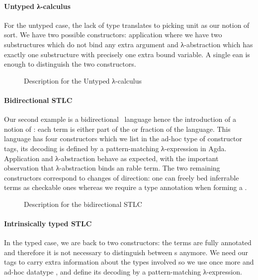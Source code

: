 \paragraph{Untyped λ-calculus} For the untyped case, the lack of
type translates to picking unit as our notion of sort. We have two possible
constructors: application where we have two substructures which do not bind
any extra argument and λ-abstraction which has exactly one substructure
with precisely one extra bound variable. A single ean is enough to
distinguish the two constructors.

\begin{figure}[h]
  \caption{Description for the Untyped λ-calculus}
\end{figure}

\paragraph{Bidirectional STLC}\label{par:bidirectional} Our second example is a
bidirectional~\cite{pierce2000local} language hence the introduction of a
notion of : each term is either part of the  or
 fraction of the language. This language has four constructors
which we list in the ad-hoc  type of constructor tags, its
decoding  is defined by a pattern-matching λ-expression in Agda.
Application and λ-abstraction behave as expected, with the important
observation that λ-abstraction binds an rable term. The two
remaining constructors correspond to changes of direction: one can freely
bed inferrable terms as checkable ones whereas we require a type
annotation when forming a .

\begin{figure}[h]
\begin{minipage}{0.4\textwidth}
\end{minipage}\hfill
\begin{minipage}{0.5\textwidth}
\end{minipage}
  \caption{Description for the bidirectional STLC}
\end{figure}

\paragraph{Intrinsically typed STLC}\label{par:intrinsicSTLC} In the typed case, we are back to two
constructors: the terms are fully annotated and therefore it is not necessary
to distinguish between s anymore. We need our tags to carry extra
information about the types involved so we use once more and ad-hoc datatype
, and define its decoding  by a pattern-matching λ-expression.

